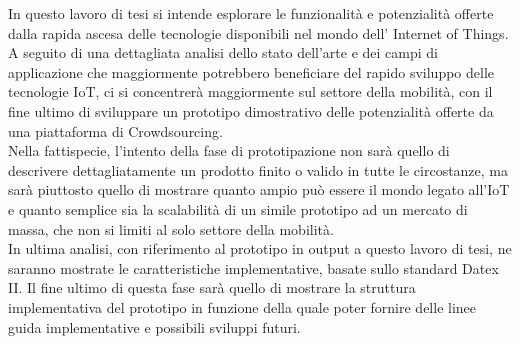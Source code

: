 \documentclass[11pt]{toptesi}
\makeatletter
\newcommand\listofcodes{%
 \iffrontmatter\else\frontmattertrue\fi
 \if@openright\cleardoublepage\else\clearpage\fi
 \begingroup\def\chapter##1{\@schapter}
 \phantomsection %
 \lstlistoflistings 
 \endgroup
}
\makeatother
\begin{document}
\sommario
In questo lavoro di tesi si intende esplorare le funzionalità e potenzialità offerte dalla rapida ascesa delle tecnologie disponibili nel mondo dell' Internet of Things. \\
A seguito di una dettagliata analisi dello stato dell'arte e dei campi di applicazione che maggiormente potrebbero beneficiare del rapido sviluppo delle tecnologie IoT, ci si concentrerà maggiormente sul settore della mobilità, con il fine ultimo di sviluppare un prototipo dimostrativo delle potenzialità offerte da una piattaforma di Crowdsourcing.\\
Nella fattispecie, l'intento della fase di prototipazione non sarà quello di descrivere dettagliatamente un prodotto finito o valido in tutte le circostanze, ma sarà piuttosto quello di mostrare quanto ampio può essere il mondo legato all'IoT e quanto semplice sia la scalabilità di un simile prototipo ad un mercato di massa, che non si limiti al solo settore della mobilità. \\
In ultima analisi, con riferimento al prototipo in output a questo lavoro di tesi, ne saranno mostrate le caratteristiche implementative, basate sullo standard Datex II. Il fine ultimo di questa fase sarà quello di mostrare la struttura implementativa del prototipo in funzione della quale poter fornire delle linee guida implementative e possibili sviluppi futuri.




\tableofcontents

\listoffigures

\listoftables

\listofcodes


\mainmatter






\appendix



{}
\nocite{*}
\printbibliography
\end{document}
